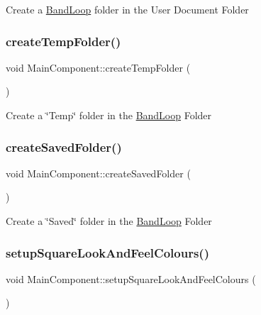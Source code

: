 Create a \mbox{\hyperlink{class_band_loop}{Band\+Loop}} folder in the User Document Folder \mbox{\label{class_main_component_ab9345f49a82ce81b98cd552e88b0ee08}} 
\subsubsection{\texorpdfstring{createTempFolder()}{createTempFolder()}}
{\footnotesize\ttfamily void Main\+Component\+::create\+Temp\+Folder (\begin{DoxyParamCaption}{ }\end{DoxyParamCaption})}

Create a \char`\"{}\+Temp\char`\"{} folder in the \mbox{\hyperlink{class_band_loop}{Band\+Loop}} Folder \mbox{\label{class_main_component_af9933860cbfc7c14fb4403e732e1f2c1}} 
\subsubsection{\texorpdfstring{createSavedFolder()}{createSavedFolder()}}
{\footnotesize\ttfamily void Main\+Component\+::create\+Saved\+Folder (\begin{DoxyParamCaption}{ }\end{DoxyParamCaption})}

Create a \char`\"{}\+Saved\char`\"{} folder in the \mbox{\hyperlink{class_band_loop}{Band\+Loop}} Folder \mbox{\label{class_main_component_a6fa14be18558d997ff7eeccc8d85e4f4}} 
\subsubsection{\texorpdfstring{setupSquareLookAndFeelColours()}{setupSquareLookAndFeelColours()}}
{\footnotesize\ttfamily void Main\+Component\+::setup\+Square\+Look\+And\+Feel\+Colours (\begin{DoxyParamCaption}{ }\end{DoxyParamCaption})}

